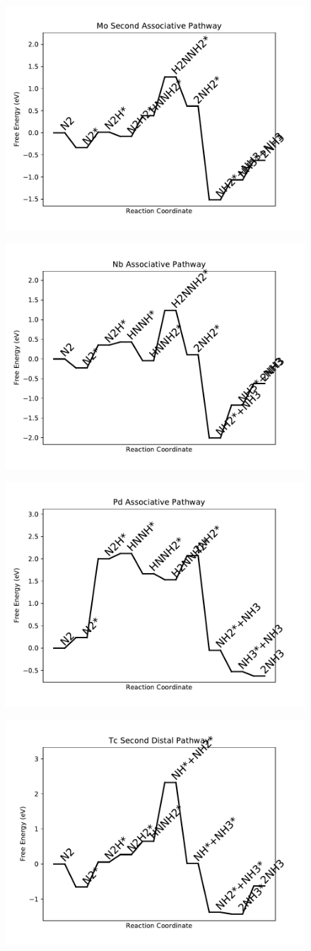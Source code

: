 \documentclass[journal=jacsat,manuscript=article]{achemso}
\begin{document}
\begin{figure}
\includegraphics[width=0.5\linewidth]{data/plots/Mo_associative_2.pdf}
\label{fig:Mo_associative_2}
\end{figure}

\newpage
\begin{figure}
\includegraphics[width=0.5\linewidth]{data/plots/Nb_associative.pdf}
\label{fig:Nb_associative}
\end{figure}

\begin{figure}
\includegraphics[width=0.5\linewidth]{data/plots/Pd_associative.pdf}
\label{fig:Pd_associative}
\end{figure}

\newpage
\begin{figure}
\includegraphics[width=0.5\linewidth]{data/plots/Tc_distal_2.pdf}
\label{fig:Tc_distal_2}
\end{figure}
\end{document}
